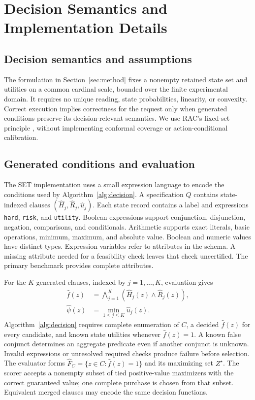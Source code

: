 \section{Decision Semantics and Implementation Details}
\label{app:proofs}
\subsection{Decision semantics and assumptions}
The formulation in Section~\ref{sec:method} fixes a nonempty retained state set and utilities on a common cardinal scale, bounded over the finite experimental domain. It requires no unique reading, state probabilities, linearity, or convexity. Correct execution implies correctness for the request only when generated conditions preserve its decision-relevant semantics. We use RAC's fixed-set principle \citep{rac}, without implementing conformal coverage or action-conditional calibration.

\label{app:ambiguity}

\subsection{Generated conditions and evaluation}
\label{app:interface}
The SET implementation uses a small expression language to encode the conditions used by Algorithm~\ref{alg:decision}. A specification $Q$ contains state-indexed clauses $(\widehat H_j,\widehat R_j,\widehat u_j)$. Each state record contains a label and expressions \texttt{hard}, \texttt{risk}, and \texttt{utility}. Boolean expressions support conjunction, disjunction, negation, comparisons, and conditionals. Arithmetic supports exact literals, basic operations, minimum, maximum, and absolute value. Boolean and numeric values have distinct types. Expression variables refer to attributes in the schema. A missing attribute needed for a feasibility check leaves that check uncertified. The primary benchmark provides complete attributes.

For the $K$ generated clauses, indexed by $j=1,\ldots,K$, evaluation gives
\begin{align}
\widehat f(z)&=\bigwedge_{j=1}^{K}(\widehat H_j(z)\wedge\widehat R_j(z)),\\
\widehat\psi(z)&=\min_{1\le j\le K}\widehat u_j(z).
\end{align}
Algorithm~\ref{alg:decision} requires complete enumeration of $C$, a decided $\widehat f(z)$ for every candidate, and known state utilities whenever $\widehat f(z)=1$. A known false conjunct determines an aggregate predicate even if another conjunct is unknown. Invalid expressions or unresolved required checks produce failure before selection. The evaluator forms $\widehat F_C=\{z\in C:\widehat f(z)=1\}$ and its maximizing set $Z^\star$. The scorer accepts a nonempty subset of tied positive-value maximizers with the correct guaranteed value; one complete purchase is chosen from that subset. Equivalent merged clauses may encode the same decision functions.

